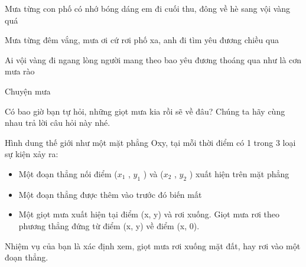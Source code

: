Mưa từng con phố có nhớ bóng dáng em đi cuối thu, đông về hè sang vội vàng quá

Mưa từng đêm vắng, mưa ơi cứ rơi phố xa, anh đi tìm yêu đương chiều qua

Ai vội vàng đi ngang lòng người mang theo bao yêu đương thoáng qua như là cơn mưa rào

Chuyện mưa

Có bao giờ bạn tự hỏi, những giọt mưa kia rồi sẽ về đâu? Chúng ta hãy cùng nhau trả lời câu hỏi này nhé.

Hình dung thế giới như một mặt phẳng Oxy, tại mỗi thời điểm có 1 trong 3 loại sự kiện xảy ra:
\begin{itemize}
	\item Một đoạn thẳng nối điểm ($x_{1}$ , $y_{1}$ ) và ($x_{2}$ , $y_{2}$ ) xuất hiện trên mặt phẳng
	\item Một đoạn thẳng được thêm vào trước đó biến mất
	\item Một giọt mưa xuất hiện tại điểm (x, y) và rơi xuống. Giọt mưa rơi theo phương thẳng đứng từ điểm (x, y) về điểm (x, 0).
\end{itemize}

Nhiệm vụ của bạn là xác định xem, giọt mưa rơi xuống mặt đất, hay rơi vào một đoạn thẳng.
